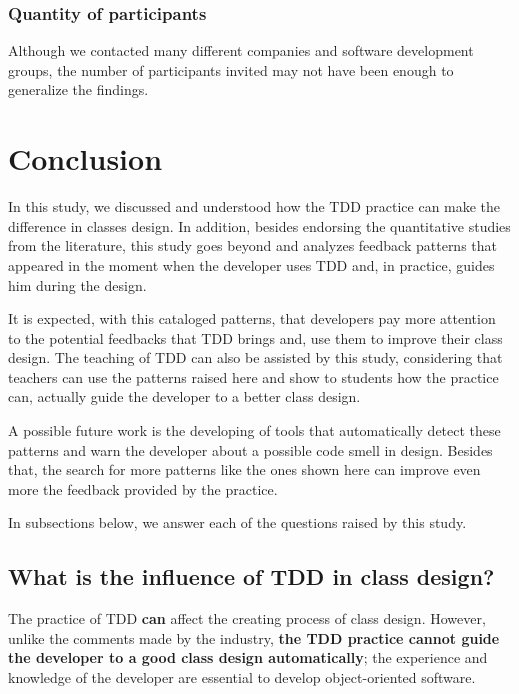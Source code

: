 \documentclass[times]{elsarticle}
\begin{document}
\subsubsection{Quantity of participants}

Although we contacted many different companies and software development groups,
the number of participants invited may not have been enough to generalize the findings.

\section{Conclusion}
\label{sec:conclusion}

In this study, we discussed and understood how the TDD practice can make the
difference in classes design.
In addition, besides endorsing the quantitative studies from the literature, this study
goes beyond and analyzes feedback patterns that appeared in the moment when
the developer uses TDD and, in practice, guides him during the design.

It is expected, with this cataloged patterns, that developers pay more attention
to the potential feedbacks that TDD brings and, use them to improve their class
design. The teaching of TDD can also be assisted by this study, considering
that teachers can use the patterns raised here and show to students
how the practice can, actually guide the developer to a better class design.

A possible future work is the developing of tools that automatically detect these patterns
and warn the developer about a possible code smell in design. Besides that,
the search for more patterns like the ones shown here can improve even more the feedback
provided by the practice.

In subsections below, we answer each of the questions raised by this study.

\subsection{What is the influence of TDD in class design?}

The practice of TDD \textbf{can} affect the creating process of class design. However,
unlike the comments made by the industry, \textbf{the TDD practice cannot guide the
developer to a good class design automatically}; the experience and knowledge of
the developer are essential to develop object-oriented software.
\end{document}
